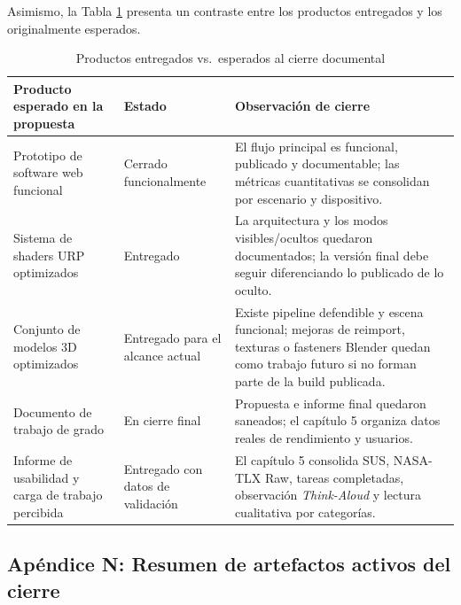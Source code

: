 Asimismo, la Tabla \ref{tab:productos_entregados_esperados} presenta un contraste entre los productos entregados y los originalmente esperados.

\begin{table}[H]
    \caption{Productos entregados vs.\ esperados al cierre documental}
    \label{tab:productos_entregados_esperados}
    \centering
    \scriptsize\singlespacing
    \begin{tabular}{p{4.3cm}p{2.5cm}p{5.5cm}}
        \hline
        \textbf{Producto esperado en la propuesta} & \textbf{Estado} & \textbf{Observación de cierre} \\ \hline
        Prototipo de software web funcional & Cerrado funcionalmente & El flujo principal es funcional, publicado y documentable; las métricas cuantitativas se consolidan por escenario y dispositivo. \\
        Sistema de shaders URP optimizados & Entregado & La arquitectura y los modos visibles/ocultos quedaron documentados; la versión final debe seguir diferenciando lo publicado de lo oculto. \\
        Conjunto de modelos 3D optimizados & Entregado para el alcance actual & Existe pipeline defendible y escena funcional; mejoras de reimport, texturas o fasteners Blender quedan como trabajo futuro si no forman parte de la build publicada. \\
        Documento de trabajo de grado & En cierre final & Propuesta e informe final quedaron saneados; el capítulo 5 organiza datos reales de rendimiento y usuarios. \\
        Informe de usabilidad y carga de trabajo percibida & Entregado con datos de validación & El capítulo 5 consolida SUS, NASA-TLX Raw, tareas completadas, observación \textit{Think-Aloud} y lectura cualitativa por categorías. \\ \hline
    \end{tabular}
    \par\vspace{0.5\baselineskip}
\end{table}

\subsection*{Apéndice N: Resumen de artefactos activos del cierre}

